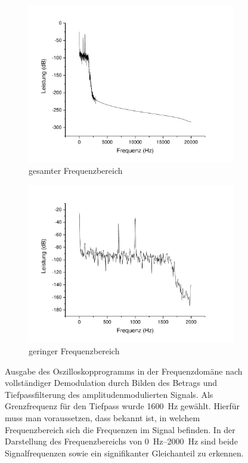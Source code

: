 \documentclass[
a4paper,
12pt,
pagesize,
ngerman
]{scrartcl}
\begin{document}
	\begin{figure}[H]
		\centering
		\begin{subfigure}[t]{0.5\textwidth}
			\centering
			\includegraphics[width=1\textwidth]{Origin-Files/AM-Demod-Betrag-demod}
			\caption{gesamter Frequenzbereich}
		\end{subfigure}%
		\begin{subfigure}[t]{0.5\textwidth}
			\centering
			\includegraphics[width=1\textwidth]{Origin-Files/AM-Demod-Betrag-demod-Bereich}
			\caption{geringer Frequenzbereich}
		\end{subfigure}
		\label{fig_tag3_am_demod_betrag_vollst}
		\caption{Ausgabe des Oszilloskopprogramms in der Frequenzdomäne nach vollständiger Demodulation durch Bilden des Betrags und Tiefpassfilterung des amplitudenmodulierten Signals.
		Als Grenzfrequenz für den Tiefpass wurde \SI{1600}{\hertz} gewählt.
		Hierfür muss man voraussetzen, dass bekannt ist, in welchem Frequenzbereich sich die Frequenzen im Signal befinden.
		In der Darstellung des Frequenzbereichs von \SIrange{0}{2000}{\hertz} sind beide Signalfrequenzen sowie ein signifikanter Gleichanteil zu erkennen. %
		}
		\centering
	\end{figure}
\end{document}
